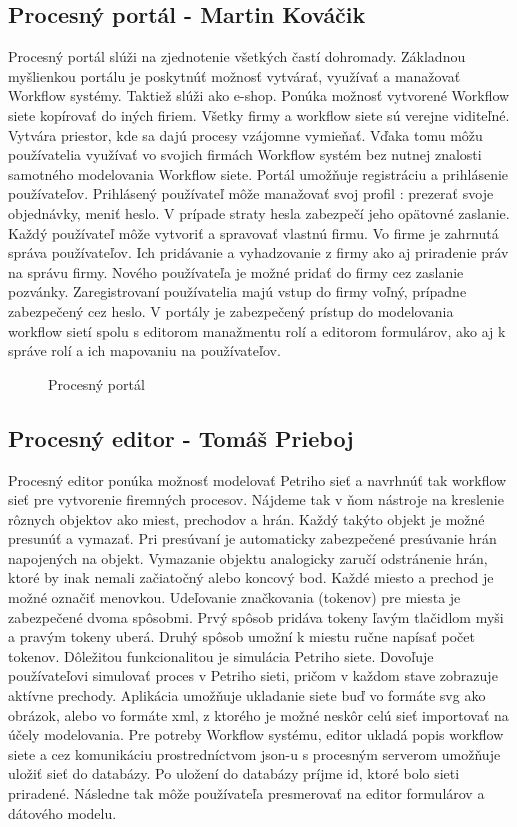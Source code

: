 \subsection{Procesný portál - Martin Kováčik}
Procesný portál slúži na zjednotenie všetkých častí dohromady. Základnou myšlienkou portálu je poskytnúť možnosť vytvárať, využívať a manažovať Workflow systémy. Taktiež slúži ako e-shop. Ponúka možnosť vytvorené Workflow siete kopírovať do iných firiem. Všetky firmy a workflow siete sú verejne viditeľné. Vytvára priestor, kde sa dajú procesy vzájomne vymieňať. Vďaka tomu môžu používatelia využívať vo svojich firmách Workflow systém bez nutnej znalosti samotného modelovania Workflow siete. Portál umožňuje registráciu a prihlásenie používateľov. Prihlásený používateľ  môže manažovať svoj profil : prezerať svoje objednávky, meniť heslo. V prípade straty hesla zabezpečí jeho opätovné zaslanie. Každý používateľ môže vytvoriť a spravovať vlastnú firmu. Vo firme je zahrnutá správa používateľov. Ich pridávanie a vyhadzovanie z firmy ako aj priradenie práv na správu firmy. Nového používateľa je možné pridať do firmy cez zaslanie pozvánky. Zaregistrovaní používatelia majú vstup do firmy voľný, prípadne zabezpečený cez heslo.  V portály je zabezpečený prístup do modelovania workflow sietí spolu s editorom manažmentu rolí a editorom formulárov, ako aj k správe rolí a ich mapovaniu na používateľov. 

\begin{figure}[h]
	\centering
	\caption{Procesný portál}
	\label{fig:procesný portál}
\end{figure}



\subsection{Procesný editor - Tomáš Prieboj}
Procesný editor ponúka možnosť modelovať Petriho sieť a navrhnúť tak workflow sieť pre vytvorenie firemných procesov. Nájdeme tak v ňom nástroje na kreslenie rôznych objektov ako miest, prechodov a hrán. Každý takýto objekt je možné presunúť a vymazať. Pri presúvaní je automaticky zabezpečené presúvanie hrán napojených na objekt. Vymazanie objektu analogicky zaručí odstránenie hrán, ktoré by inak nemali začiatočný alebo koncový bod. Každé miesto a prechod je možné označiť menovkou. Udeľovanie značkovania (tokenov) pre miesta je zabezpečené dvoma spôsobmi. Prvý spôsob pridáva tokeny ľavým tlačidlom myši a  pravým tokeny uberá. Druhý spôsob umožní k miestu ručne napísať počet tokenov. Dôležitou funkcionalitou je simulácia Petriho siete. Dovoľuje používateľovi simulovať proces v Petriho sieti, pričom v každom stave zobrazuje aktívne prechody. Aplikácia umožňuje ukladanie siete buď vo formáte svg ako obrázok, alebo vo formáte xml, z ktorého je možné neskôr celú sieť importovať na účely modelovania. Pre potreby Workflow systému, editor ukladá popis workflow siete a cez komunikáciu prostredníctvom json-u s procesným serverom umožňuje uložiť sieť do databázy. Po uložení do databázy príjme id, ktoré bolo sieti priradené. Následne tak môže používateľa presmerovať na editor formulárov a dátového modelu.

